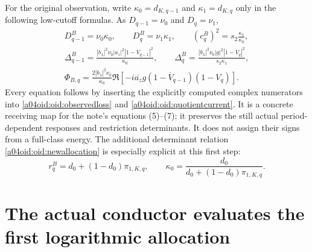 \documentclass[11pt,a4paper]{article}
\begin{document}
For the original observation, write
$\kappa_0=d_{K,q-1}$ and $\kappa_1=d_{K,q}$ only in the following
low-cutoff formulas. As $D_{q-1}=\nu_0$ and $D_q=\nu_1$,
\begin{equation}\label{a04oid:oid:lowobservation}
\begin{gathered}
 D_{q-1}^B=\nu_0\kappa_0,\qquad
 D_q^B=\nu_1\kappa_1,\qquad
 (c_q^B)^2=s_2\frac{\kappa_1}{\kappa_0},\\
 \Delta_{q-1}^B=
 \frac{|b_\lambda|^2\nu_0|a_z|^2|1-V_{q-1}|^2}{\kappa_0},
 \qquad
 \Delta_q^B=
 \frac{|b_\lambda|^2\nu_0|g|^2|1-V_q|^2}{s_2\kappa_1},\\
 \boxed{\Phi_{B,q}=
 \frac{2|b_\lambda|^2\nu_0}{\kappa_0}
 \Re\left[-i\overline{a_z}g
 (1-\overline V_{q-1})(1-V_q)\right].}
\end{gathered}
\end{equation}
Every equation follows by inserting the explicitly computed complex
numerators into \eqref{a04oid:oid:observedloss} and
\eqref{a04oid:oid:quotientcurrent}. It is a concrete receiving map for the
note's equations (5)--(7); it preserves the still actual
period-dependent responses and restriction determinants.
It does not assign their signs from a full-class energy.
The additional determinant relation \eqref{a04oid:oid:newallocation} is
especially explicit at this first step:
\begin{equation}\label{a04oid:oid:lowallocation}
 \boxed{r_q^B=d_0+(1-d_0)\pi_{1,K,q},\qquad
 \kappa_0=\frac{d_0}{d_0+(1-d_0)\pi_{1,K,q}}.}
\end{equation}

\section{The actual conductor evaluates the first logarithmic allocation}
\end{document}
